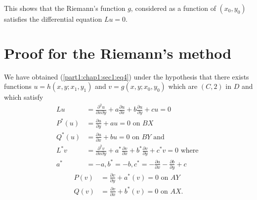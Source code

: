 This shows that the Riemann's function $g$, considered as a function
of $(x_0, y_0)$ satisfies the differential equation $Lu = 0$. 

\section{Proof for the Riemann's method}\label{part1:chap1:sec2}

We have obtained (\ref{part1:chap1:sec1:eq4}) under the hypothesis that there exists
functions $u=h(x,y ; x_1,y_1)$ and $v=g(x,y ; x_0,y_0)$ which are $(C,
2)$ in $D$ and which satisfy 
\begin{align*}
  Lu & =  \frac{\partial^2 u}{\partial x \partial y}+ a \frac{\partial
    u}{\partial x} + b \frac{\partial u}{ \partial y}+ cu = 0 \\ 
  P^* (u) & = \frac{\partial u}{\partial y}+au = 0 \text{ on }BX \\
  Q^* (u) & = \frac{\partial u}{\partial x}+bu = 0 \text{ on }BY \text{ and } \\
  L^* v & = \frac{\partial^2 v}{\partial x \partial y}+ a^*
  \frac{\partial v}{\partial x}+b^* \frac{\partial v}{\partial y}+c^*
  v = 0 \text{ where } \\
  a^* & = -a, b^* = -b, c^* = - \frac{\partial a}{\partial x} -
  \frac{\partial b}{\partial y}+c 
\end{align*}
\begin{align*}
  P(v) &= \frac{\partial v}{\partial y} + a^* (v) = 0 \text{ on } AY \\
  Q(v) &= \frac{\partial v}{\partial x}+b^* (v) = 0 \text{ on } AX.
\end{align*}


